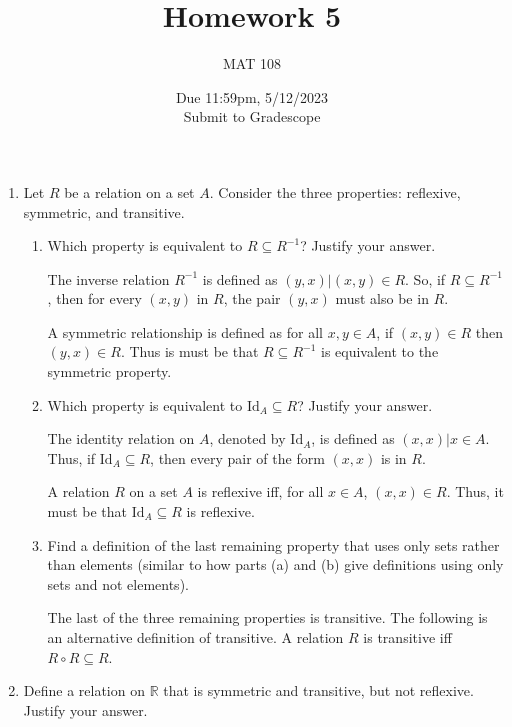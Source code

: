\documentclass{article}
\title{Homework 5}
\author{MAT 108}
\date{Due 11:59pm, 5/12/2023\\ 
\vspace{0.1cm}
Submit to Gradescope}
\newcommand{\bR}{\mathbb{R}}
\begin{document}
\maketitle

{\large

\begin{enumerate}[labelindent=0pt,leftmargin=0pt]

    \setlength{\itemsep}{13pt} 

    \item Let $R$ be a relation on a set $A$. Consider the three properties: reflexive, symmetric, and transitive.\begin{enumerate}
    \item Which property is equivalent to $R\subseteq R^{-1}$? Justify your answer.

    The inverse relation $R^{-1}$ is defined as ${(y, x) | (x, y) \in R}$. So, if $R\subseteq R^{-1}$, then for every  $(x, y)$ in $R$, the pair $(y, x)$ must also be in $R$.

    A symmetric relationship is defined as for all $x, y \in A$, if $(x, y) \in R$ then $(y, x) \in R$. Thus is must be that $R\subseteq R^{-1}$ is equivalent to the symmetric property. 
    
    \item Which property is equivalent to $\text{Id}_A\subseteq R$? Justify your answer.

    The identity relation on $A$, denoted by $\text{Id}_A$, is defined as ${(x, x) | x \in A}$. 
    Thus, if $\text{Id}_A\subseteq R$, then every pair of the form $(x, x)$ is in $R$.

    A relation $R$ on a set $A$ is reflexive iff, for all $x \in A$, $(x, x) \in R$. 
    Thus, it must be that $\text{Id}_A\subseteq R$ is reflexive. 
    
    \item Find a definition of the last remaining property that uses only sets rather than elements (similar to how parts (a) and (b) give definitions using only sets and not elements).

    The last of the three remaining properties is transitive. 
    The following is an alternative definition of transitive. 
    A relation $R$ is transitive iff $R \circ R \subseteq R$.
    
    \end{enumerate}
    

    \item Define a relation on $\bR$ that is symmetric and transitive, but not reflexive. Justify your answer.


\end{enumerate}}
\end{document}
